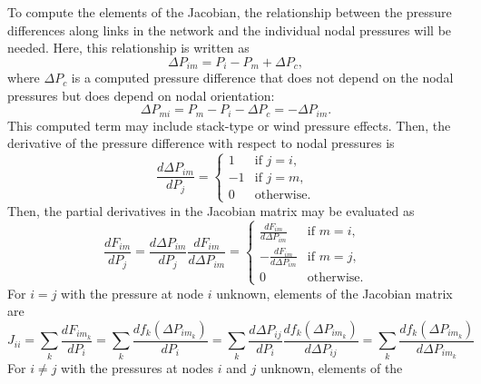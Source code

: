 \documentclass[10pt]{report}
\begin{document}
To compute the elements of the Jacobian, the relationship between the pressure differences along links in the network and the individual nodal pressures will be needed. Here, this relationship is written as
\begin{equation}
\Delta P_{im} = P_i - P_m + \Delta P_c,
\end{equation}
where $\Delta P_c$ is a computed pressure difference that does not depend on 
the nodal pressures but does depend on nodal orientation:
\begin{equation}
\Delta P_{mi} = P_m - P_i - \Delta P_c = -\Delta P_{im}.
\end{equation}
This computed term may include stack-type or wind pressure effects. 
Then, the derivative of the pressure difference with respect to nodal pressures 
is
\begin{equation}
\frac{d \Delta P_{im}}{d P_j} = \begin{cases}
1 &\text{if $j=i$},\\
-1 &\text{if $j=m$},\\
0 &\text{otherwise}.
\end{cases}
\end{equation}
Then, the partial derivatives in the Jacobian matrix may be evaluated as
\begin{equation}
\frac{d F_{im}}{d P_j} = \frac{d \Delta P_{im}}
  {d P_j} \frac{d F_{im}}{d \Delta P_{im}}
  = \begin{cases}
  \frac{d F_{im}}{d \Delta P_{im}} &\text{if $m=i$},\\
  -\frac{d F_{im}}{d \Delta P_{im}} &\text{if $m=j$},\\
  0 &\text{otherwise}.
  \end{cases}
\end{equation}
For $i=j$ with the pressure at node $i$ unknown, elements of the Jacobian matrix
are
\begin{equation}
J_{ii} = \sum_k \frac{dF_{im_k}}{dP_i}
       = \sum_k \frac{df_k\left(\Delta P_{im_k}\right)}{dP_i}
       = \sum_k \frac{d\Delta P_{ij}}{dP_i}
                \frac{df_k\left(\Delta P_{im_k}\right)}{d\Delta P_{ij}}
       = \sum_k \frac{df_k\left(\Delta P_{im_k}\right)}{d\Delta P_{im_k}}
\end{equation}
For $i\ne j$ with the pressures at nodes $i$ and $j$ unknown, elements of the
\end{document}
